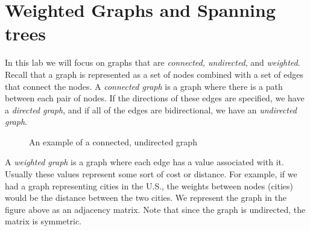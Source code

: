 

\label{lab:Kruskal}


\section*{Weighted Graphs and Spanning trees}

In this lab we will focus on graphs that are \emph{connected, undirected}, and \emph{weighted}. Recall that a graph is represented as a set of nodes combined with a set of edges that connect the nodes. A \emph{connected graph} is a graph where there is a path between each pair of nodes. If the directions of these edges are specified, we have a \emph{directed graph}, and if all of the edges are bidirectional, we have an \emph{undirected graph}.

\begin{figure}[h]
\caption{An example of a connected, undirected graph}
\label{mst:graph1}
\end{figure}

A \emph{weighted graph} is a graph where each edge has a value associated with it.
Usually these values represent some sort of cost or distance. For example, if we had a graph representing cities in the U.S., the weights between nodes (cities) would be the distance between the two cities. We represent the graph in the figure above as an adjacency matrix. Note that since the graph is undirected, the matrix is symmetric.

